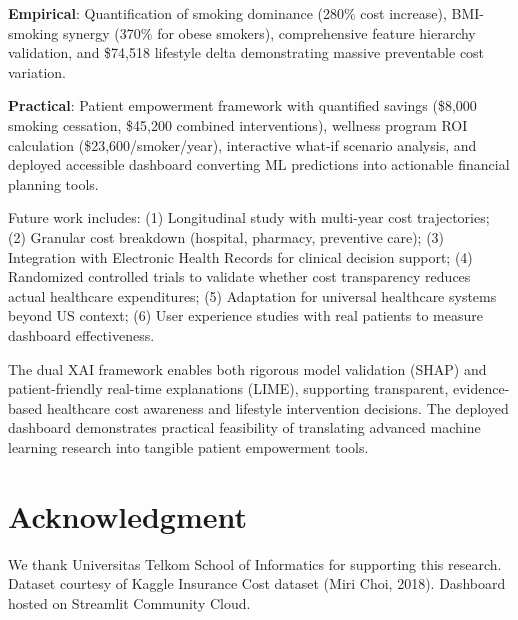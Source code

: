 \documentclass[conference]{IEEEtran}
\begin{document}
\textbf{Empirical}: Quantification of smoking dominance (280\% cost increase), BMI-smoking synergy (370\% for obese smokers), comprehensive feature hierarchy validation, and \$74,518 lifestyle delta demonstrating massive preventable cost variation.

\textbf{Practical}: Patient empowerment framework with quantified savings (\$8,000 smoking cessation, \$45,200 combined interventions), wellness program ROI calculation (\$23,600/smoker/year), interactive what-if scenario analysis, and deployed accessible dashboard converting ML predictions into actionable financial planning tools.

Future work includes: (1) Longitudinal study with multi-year cost trajectories; (2) Granular cost breakdown (hospital, pharmacy, preventive care); (3) Integration with Electronic Health Records for clinical decision support; (4) Randomized controlled trials to validate whether cost transparency reduces actual healthcare expenditures; (5) Adaptation for universal healthcare systems beyond US context; (6) User experience studies with real patients to measure dashboard effectiveness.

The dual XAI framework enables both rigorous model validation (SHAP) and patient-friendly real-time explanations (LIME), supporting transparent, evidence-based healthcare cost awareness and lifestyle intervention decisions. The deployed dashboard demonstrates practical feasibility of translating advanced machine learning research into tangible patient empowerment tools.

\section*{Acknowledgment}
We thank Universitas Telkom School of Informatics for supporting this research. Dataset courtesy of Kaggle Insurance Cost dataset (Miri Choi, 2018). Dashboard hosted on Streamlit Community Cloud.
\end{document}
